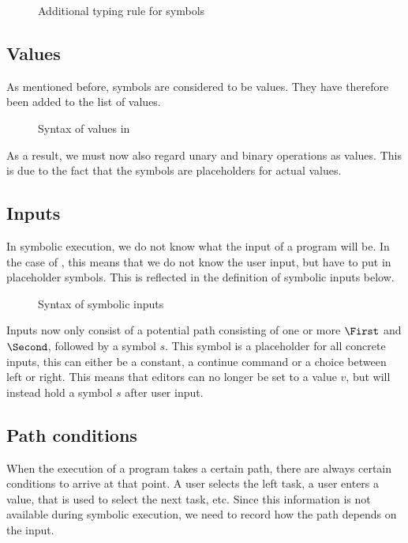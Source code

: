 \begin{figure}
  \small
  \caption{Additional typing rule for symbols}
  \label{fig:typingsymbol}
\end{figure}

\subsection{Values}

As mentioned before, symbols are considered to be values.
They have therefore been added to the list of values.

\begin{figure}
  \small
  \caption{Syntax of values in \TOPHAT}
  \label{fig:syntaxvalues}
\end{figure}

As a result, we must now also regard unary and binary operations as values.
This is due to the fact that the symbols are placeholders for actual values.


\subsection{Inputs}

In symbolic execution, we do not know what the input of a program will be.
In the case of \TOPHAT, this means that we do not know the user input, but have to put in placeholder symbols.
This is reflected in the definition of symbolic inputs below.

\begin{figure}
  \small
  \caption{Syntax of symbolic inputs}
  \label{fig:syntaxinputs}
\end{figure}

Inputs now only consist of a potential path consisting of one or more $\First$ and $\Second$,
followed by a symbol $s$.
This symbol is a placeholder for all concrete inputs, this can either be a constant, a continue command or a choice between left or right.
This means that editors can no longer be set to a value $v$, but will instead hold a symbol $s$ after user input.


\subsection{Path conditions}

When the execution of a \TOPHAT program takes a certain path, there are always certain conditions to arrive at that point.
A user selects the left task, a user enters a value, that is used to select the next task, etc.
Since this information is not available during symbolic execution, we need to record how the path depends on the input.

